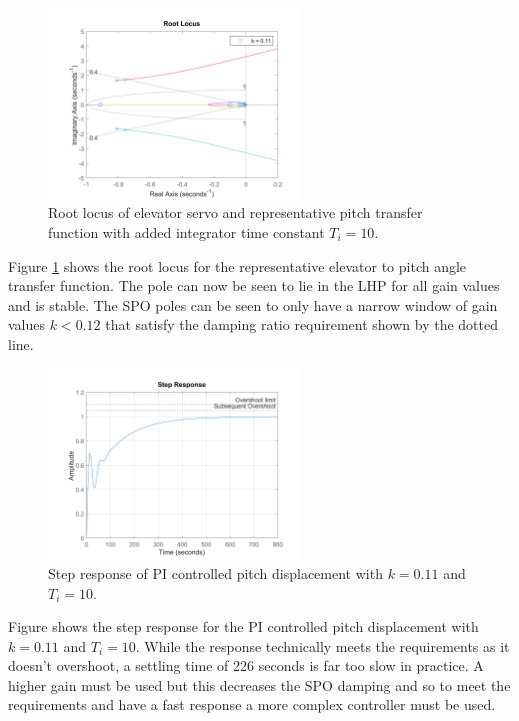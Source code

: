 \documentclass{article}
\begin{document}
\begin{figure}[H]
    \centering
    \includegraphics[width=0.6\textwidth]{figures/pitch_autopilot_locus_Ti.png}
    \caption{Root locus of elevator servo and representative pitch transfer function \cite{rep} with added integrator time constant $T_i = 10$.}
    \label{fig:representative_pitchrate_rlocus_int}
\end{figure}

Figure \ref{fig:representative_pitchrate_rlocus_int} shows the root locus for the representative elevator to pitch angle transfer function.
The pole can now be seen to lie in the LHP for all gain values and is stable.
The SPO poles can be seen to only have a narrow window of gain values $k < 0.12$ that satisfy the damping ratio requirement shown by the dotted line.

\begin{figure}[H]
    \centering
    \includegraphics[width=0.6\textwidth]{figures/pitch_autopilot_uncompensated_step.png}
    \caption{Step response of PI controlled pitch displacement with $k=0.11$ and $T_i = 10$.}
    \label{fig:pitch_autopilot_uncompensated_step}
\end{figure}

Figure shows the step response for the PI controlled pitch displacement with $k=0.11$ and $T_i = 10$.
While the response technically meets the requirements as it doesn't overshoot, a settling time of 226 seconds is far too slow in practice.
A higher gain must be used but this decreases the SPO damping and so to meet the requirements and have a fast response a more complex controller must be used.
\end{document}
